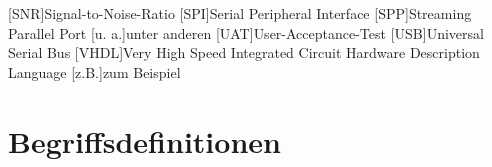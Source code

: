\begin{acronym}[SEPSEP]
[SNR]{Signal-to-Noise-Ratio}
[SPI]{Serial Peripheral Interface}
[SPP]{Streaming Parallel Port}
[u. a.]{unter anderen}
[UAT]{User-Acceptance-Test}
[USB]{Universal Serial Bus}
[VHDL]{Very High Speed Integrated Circuit Hardware Description Language}
[z.B.]{zum Beispiel}


\end{acronym}




\newpage
\section{Begriffsdefinitionen}

